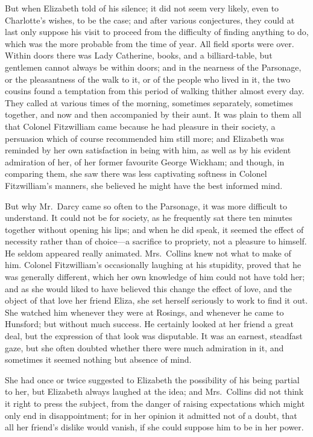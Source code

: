 But when Elizabeth told of his silence; it did not seem very
likely, even to Charlotte's wishes, to be the case; and after
various conjectures, they could at last only suppose his visit to
proceed from the difficulty of finding anything to do, which was
the more probable from the time of year.  All field sports were
over.  Within doors there was Lady Catherine, books, and a
billiard-table, but gentlemen cannot always be within doors; and
in the nearness of the Parsonage, or the pleasantness of the walk
to it, or of the people who lived in it, the two cousins found a
temptation from this period of walking thither almost every day.
They called at various times of the morning, sometimes
separately, sometimes together, and now and then accompanied
by their aunt.  It was plain to them all that Colonel Fitzwilliam
came because he had pleasure in their society, a persuasion
which of course recommended him still more; and Elizabeth was
reminded by her own satisfaction in being with him, as well as by
his evident admiration of her, of her former favourite George
Wickham; and though, in comparing them, she saw there was
less captivating softness in Colonel Fitzwilliam's manners, she
believed he might have the best informed mind.

But why Mr.\ Darcy came so often to the Parsonage, it was more
difficult to understand.  It could not be for society, as he
frequently sat there ten minutes together without opening his
lips; and when he did speak, it seemed the effect of necessity
rather than of choice---a sacrifice to propriety, not a pleasure
to himself.  He seldom appeared really animated.  Mrs.\ Collins
knew not what to make of him.  Colonel Fitzwilliam's occasionally
laughing at his stupidity, proved that he was generally different,
which her own knowledge of him could not have told her; and as
she would liked to have believed this change the effect of love,
and the object of that love her friend Eliza, she set herself
seriously to work to find it out.  She watched him whenever they
were at Rosings, and whenever he came to Hunsford; but without
much success.  He certainly looked at her friend a great deal,
but the expression of that look was disputable.  It was an
earnest, steadfast gaze, but she often doubted whether there
were much admiration in it, and sometimes it seemed nothing but
absence of mind.

She had once or twice suggested to Elizabeth the possibility of
his being partial to her, but Elizabeth always laughed at the idea;
and Mrs.\ Collins did not think it right to press the subject, from
the danger of raising expectations which might only end in
disappointment; for in her opinion it admitted not of a doubt,
that all her friend's dislike would vanish, if she could suppose
him to be in her power.


